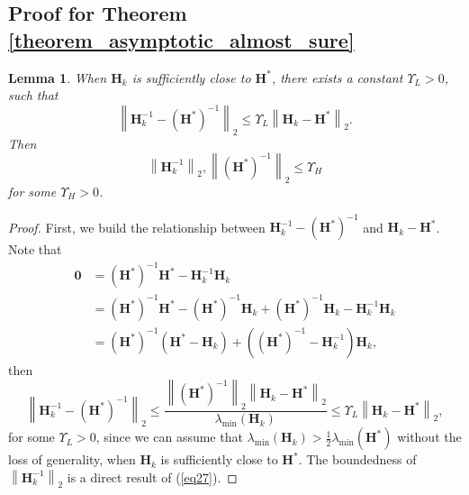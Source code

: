 \documentclass[aos]{imsart}
\numberwithin{equation}{section}
\theoremstyle{plain}
\newtheorem{lemma}{Lemma}
\begin{document}
\begin{appendix}
\subsection{Proof for Theorem \ref{theorem_asymptotic_almost_sure}}


\begin{lemma}
\label{lemma26}
    When $\bm{H}_k$ is sufficiently close to $\bm{H}^{*}$, there exists a constant $\Upsilon_{L} > 0$, such that 
    \begin{equation}
    \label{eq27}
         \left\| \bm{H}_k^{-1} - \left(\bm{H}^{*}\right)^{-1}  \right\|_2 \leq  \Upsilon_{L} \left\| \bm{H}_k - \bm{H}^{*} \right\|_2.
    \end{equation}
    Then 
    \begin{equation*}
        \left\|  \bm{H}_k^{-1} \right\|_2, \left\|  \left(\bm{H}^{*}\right)^{-1} \right\|_2 \leq \Upsilon_{H}
    \end{equation*}
    for some $\Upsilon_{H} > 0$.
\end{lemma}


\begin{proof}
     First, we build the relationship between $\bm{H}_k^{-1} - \left(\bm{H}^{*}\right)^{-1}$ and $\bm{H}_k - \bm{H}^{*}$. Note that
    \begin{equation}
        \begin{split}
            \bm{0} & =  \left(\bm{H}^{*}\right)^{-1} \bm{H}^{*} - \bm{H}_k^{-1}\bm{H}_k\\
            & = \left(\bm{H}^{*}\right)^{-1} \bm{H}^{*} - \left(\bm{H}^{*}\right)^{-1} \bm{H}_{k} + \left(\bm{H}^{*}\right)^{-1} \bm{H}_{k} - \bm{H}_k^{-1}\bm{H}_k \\
            & = \left(\bm{H}^{*}\right)^{-1}  \left( \bm{H}^{*} - \bm{H}_{k}  \right) + \left( \left(\bm{H}^{*}\right)^{-1} - \bm{H}_k^{-1}\right) \bm{H}_k ,
        \end{split}
    \end{equation}
    then 
    \begin{equation}
        \left\| \bm{H}_k^{-1} - \left(\bm{H}^{*}\right)^{-1}  \right\|_2 \leq \frac{\left\|\left(\bm{H}^{*}\right)^{-1} \right\|_2 \left\| \bm{H}_k - \bm{H}^{*} \right\|_2}{\lambda_{\min}\left( \bm{H}_{k} \right)} \leq \Upsilon_{L} \left\| \bm{H}_k - \bm{H}^{*} \right\|_2,
    \end{equation}
    for some $\Upsilon_{L}>0$, since we can assume that $\lambda_{\min}\left( \bm{H}_{k} \right) > \frac{1}{2} \lambda_{\min}\left( \bm{H}^{*} \right)$  without the loss of generality, when $\bm{H}_k$ is sufficiently close to $\bm{H}^{*}$. The boundedness of $\left\|  \bm{H}_k^{-1} \right\|_2$ is a direct result of (\ref{eq27}).  
\end{proof}




\end{appendix}
\end{document}
